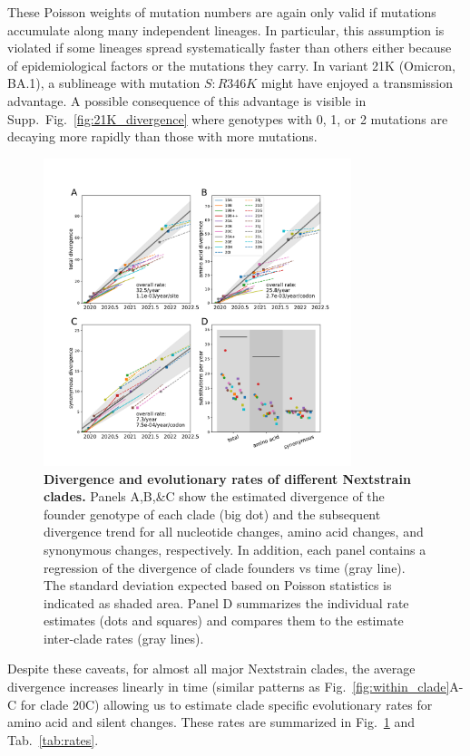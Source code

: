 \documentclass[aps,rmp, twocolumn]{revtex4}
\begin{document}
These Poisson weights of mutation numbers are again only valid if mutations accumulate along many independent lineages.
In particular, this assumption is violated if some lineages spread systematically faster than others either because of epidemiological factors or the mutations they carry.
In variant 21K (Omicron, BA.1), a sublineage with mutation $S:R346K$ might have enjoyed a transmission advantage.
A possible consequence of this advantage is visible in Supp.~Fig.~\ref{fig:21K_divergence} where genotypes with 0, 1, or 2 mutations are decaying more rapidly than those with more mutations.

\begin{figure}
    \includegraphics[width=0.8\textwidth]{figures/rate_summary.pdf}
    \caption[]{{\bf Divergence and evolutionary rates of different Nextstrain clades.} Panels A,B,\&C show the estimated divergence of the founder genotype of each clade (big dot) and the subsequent divergence trend for all nucleotide changes, amino acid changes, and synonymous changes, respectively. In addition, each panel contains a regression of the divergence of clade founders vs time (gray line).
    The standard deviation expected based on Poisson statistics is indicated as shaded area.
    Panel D summarizes the individual rate estimates (dots and squares) and compares them to the estimate inter-clade rates (gray lines).
    \label{fig:rate_summary} }
\end{figure}

Despite these caveats, for almost all major Nextstrain clades, the average divergence increases linearly in time (similar patterns as Fig.~\ref{fig:within_clade}A-C for clade 20C) allowing us to estimate clade specific evolutionary rates for amino acid and silent changes.
These rates are summarized in Fig.~\ref{fig:rate_summary} and Tab.~\ref{tab:rates}.
\end{document}
